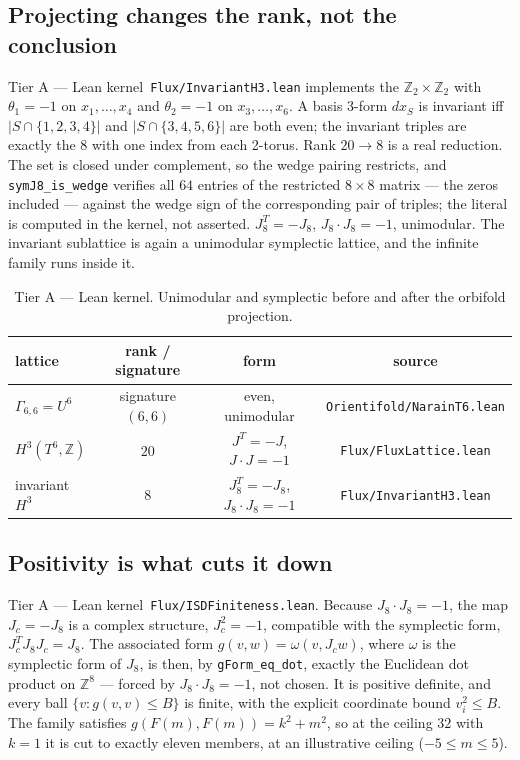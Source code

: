 \documentclass[11pt,a4paper]{article}
\theoremstyle{remark}
\newcommand{\tierA}{\colorbox{green!15}{\textsf{\scriptsize Tier A --- Lean kernel}}}
\newcommand{\lean}[1]{\texttt{#1}}
\begin{document}
\subsection{Projecting changes the rank, not the conclusion}

\tierA\ \lean{Flux/InvariantH3.lean} implements the $\mathbb{Z}_2\times\mathbb{Z}_2$ with $\theta_1 = -1$ on
$x_1,\dots,x_4$ and $\theta_2 = -1$ on $x_3,\dots,x_6$. A basis 3-form $dx_S$ is invariant iff
$|S \cap \{1,2,3,4\}|$ and $|S \cap \{3,4,5,6\}|$ are both even; the invariant triples are exactly the $8$ with
one index from each 2-torus. Rank $20 \to 8$ is a real reduction. The set is closed under complement, so the
wedge pairing restricts, and \lean{symJ8\_is\_wedge} verifies all $64$ entries of the restricted $8\times 8$
matrix --- the zeros included --- against the wedge sign of the corresponding pair of triples; the literal is
computed in the kernel, not asserted. $J_8^{T} = -J_8$, $J_8\!\cdot\!J_8 = -1$, unimodular. The invariant
sublattice is again a unimodular symplectic lattice, and the infinite family runs inside it.

\begin{table}[h]\centering
\begin{tabular}{lccc}
\hline
lattice & rank / signature & form & source \\
\hline
$\Gamma_{6,6} = U^6$ & signature $(6,6)$ & even, unimodular & \lean{Orientifold/NarainT6.lean} \\
$H^3(T^6,\mathbb{Z})$ & $20$ & $J^T=-J$, $J\!\cdot\!J=-1$ & \lean{Flux/FluxLattice.lean} \\
invariant $H^3$ & $8$ & $J_8^T=-J_8$, $J_8\!\cdot\!J_8=-1$ & \lean{Flux/InvariantH3.lean} \\
\hline
\end{tabular}
\caption{\tierA. Unimodular and symplectic before and after the orbifold projection.}
\end{table}

\subsection{Positivity is what cuts it down}

\tierA\ \lean{Flux/ISDFiniteness.lean}. Because $J_8\!\cdot\!J_8 = -1$, the map $J_c = -J_8$ is a complex
structure, $J_c^2 = -1$, compatible with the symplectic form, $J_c^{T} J_8 J_c = J_8$. The associated form
$g(v,w) = \omega(v, J_c w)$, where $\omega$ is the symplectic form of $J_8$, is then, by \lean{gForm\_eq\_dot},
exactly the Euclidean dot product on $\mathbb{Z}^8$ --- forced by $J_8\!\cdot\!J_8 = -1$, not chosen. It is
positive definite, and every ball $\{v : g(v,v) \le B\}$ is finite, with the explicit coordinate bound
$v_i^2 \le B$. The family satisfies $g(F(m),F(m)) = k^2 + m^2$, so at the ceiling $32$ with $k = 1$ it is cut to
exactly eleven members, at an illustrative ceiling ($-5 \le m \le 5$).
\end{document}
